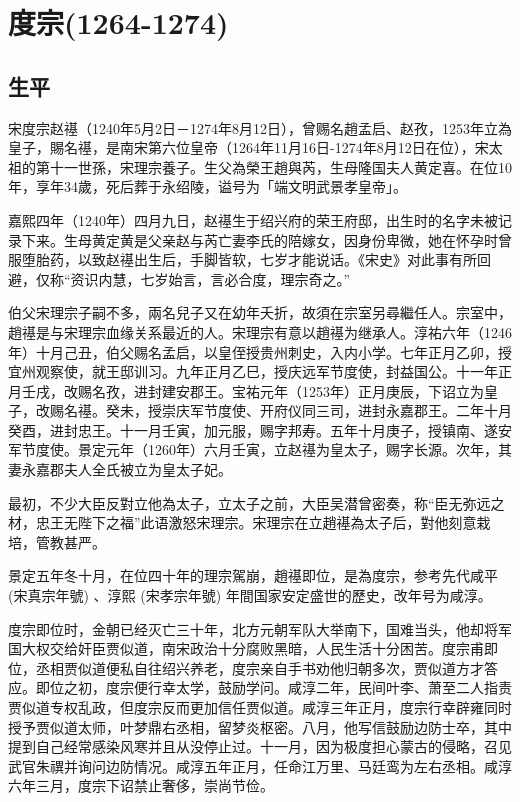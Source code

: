 
\section{度宗\tiny(1264-1274)}

\subsection{生平}

宋度宗赵禥（1240年5月2日－1274年8月12日），曾赐名趙孟启、赵孜，1253年立為皇子，賜名禥，是南宋第六位皇帝（1264年11月16日-1274年8月12日在位），宋太祖的第十一世孫，宋理宗養子。生父為榮王趙與芮，生母隆国夫人黄定喜。在位10年，享年34歲，死后葬于永绍陵，谥号为「端文明武景孝皇帝」。

嘉熙四年（1240年）四月九日，赵禥生于绍兴府的荣王府邸，出生时的名字未被记录下来。生母黄定黄是父亲赵与芮亡妻李氏的陪嫁女，因身份卑微，她在怀孕时曾服堕胎药，以致赵禥出生后，手脚皆软，七岁才能说话。《宋史》对此事有所回避，仅称“资识内慧，七岁始言，言必合度，理宗奇之。”

伯父宋理宗子嗣不多，兩名兒子又在幼年夭折，故須在宗室另尋繼任人。宗室中，趙禥是与宋理宗血缘关系最近的人。宋理宗有意以趙禥为继承人。淳祐六年（1246年）十月己丑，伯父赐名孟启，以皇侄授贵州刺史，入内小学。七年正月乙卯，授宜州观察使，就王邸训习。九年正月乙巳，授庆远军节度使，封益国公。十一年正月壬戌，改赐名孜，进封建安郡王。宝祐元年（1253年）正月庚辰，下诏立为皇子，改赐名禥。癸未，授崇庆军节度使、开府仪同三司，进封永嘉郡王。二年十月癸酉，进封忠王。十一月壬寅，加元服，赐字邦寿。五年十月庚子，授镇南、遂安军节度使。景定元年（1260年）六月壬寅，立赵禥为皇太子，赐字长源。次年，其妻永嘉郡夫人全氏被立为皇太子妃。

最初，不少大臣反對立他為太子，立太子之前，大臣吴潜曾密奏，称“臣无弥远之材，忠王无陛下之福”此语激怒宋理宗。宋理宗在立趙禥為太子后，對他刻意栽培，管教甚严。

景定五年冬十月，在位四十年的理宗駕崩，趙禥即位，是為度宗，参考先代咸平 (宋真宗年號) 、淳熙 (宋孝宗年號) 年間国家安定盛世的歷史，改年号为咸淳。

度宗即位时，金朝已经灭亡三十年，北方元朝军队大举南下，国难当头，他却将军国大权交给奸臣贾似道，南宋政治十分腐败黑暗，人民生活十分困苦。度宗甫即位，丞相贾似道便私自往绍兴养老，度宗亲自手书劝他归朝多次，贾似道方才答应。即位之初，度宗便行幸太学，鼓励学问。咸淳二年，民间叶李、萧至二人指责贾似道专权乱政，但度宗反而更加信任贾似道。咸淳三年正月，度宗行幸辟雍同时授予贾似道太师，叶梦鼎右丞相，留梦炎枢密。八月，他写信鼓励边防士卒，其中提到自己经常感染风寒并且从没停止过。十一月，因为极度担心蒙古的侵略，召见武官朱禩并询问边防情况。咸淳五年正月，任命江万里、马廷鸾为左右丞相。咸淳六年三月，度宗下诏禁止奢侈，崇尚节俭。

